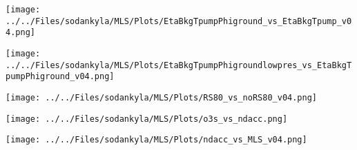 \begin{frame}
\texttt{[image: ../../Files/sodankyla/MLS/Plots/EtaBkgTpumpPhiground\_vs\_EtaBkgTpump\_v04.png]}\\
\end{frame}

\begin{frame}
\texttt{[image: ../../Files/sodankyla/MLS/Plots/EtaBkgTpumpPhigroundlowpres\_vs\_EtaBkgTpumpPhiground\_v04.png]}\\
\end{frame}

\begin{frame}
\texttt{[image: ../../Files/sodankyla/MLS/Plots/RS80\_vs\_noRS80\_v04.png]}\\
\end{frame}

\begin{frame}
\texttt{[image: ../../Files/sodankyla/MLS/Plots/o3s\_vs\_ndacc.png]}\\
\end{frame}

%

\begin{frame}
\texttt{[image: ../../Files/sodankyla/MLS/Plots/ndacc\_vs\_MLS\_v04.png]}\\
\end{frame}

